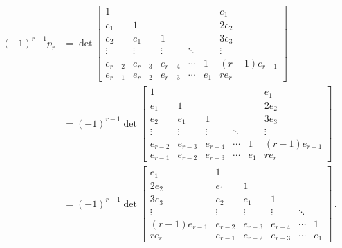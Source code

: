 \begin{align*}
      (-1)^{r-1} p_r
  &=  \det
      \begin{bmatrix}
        1       &         &         &         &     &   e_1         \\
        e_1     & 1       &         &         &     & 2 e_2         \\
        e_2     & e_1     & 1       &         &     & 3 e_3         \\
        \vdots  & \vdots  & \vdots  & \ddots  &     & \vdots        \\
        e_{r-2} & e_{r-3} & e_{r-4} & \cdots  & 1   & (r-1) e_{r-1} \\
        e_{r-1} & e_{r-2} & e_{r-3} & \cdots  & e_1 & r e_r
      \end{bmatrix}
  \\
  &=  (-1)^{r-1}
      \det
      \begin{bmatrix}
        1       &         &         &         &     &   e_1         \\
        e_1     & 1       &         &         &     & 2 e_2         \\
        e_2     & e_1     & 1       &         &     & 3 e_3         \\
        \vdots  & \vdots  & \vdots  & \ddots  &     & \vdots        \\
        e_{r-2} & e_{r-3} & e_{r-4} & \cdots  & 1   & (r-1) e_{r-1} \\
        e_{r-1} & e_{r-2} & e_{r-3} & \cdots  & e_1 & r e_r
      \end{bmatrix}
  \\
  &=  (-1)^{r-1}
      \det
      \begin{bmatrix}
          e_1         & 1       &         &         &         &     \\
        2 e_2         & e_1     & 1       &         &         &     \\
        3 e_3         & e_2     & e_1     & 1       &         &     \\
        \vdots        & \vdots  & \vdots  & \vdots  & \ddots  &     \\
        (r-1) e_{r-1} & e_{r-2} & e_{r-3} & e_{r-4} & \cdots  & 1   \\
        r e_r         & e_{r-1} & e_{r-2} & e_{r-3} & \cdots  & e_1
      \end{bmatrix} \,.
\end{align*}
\endgroup











